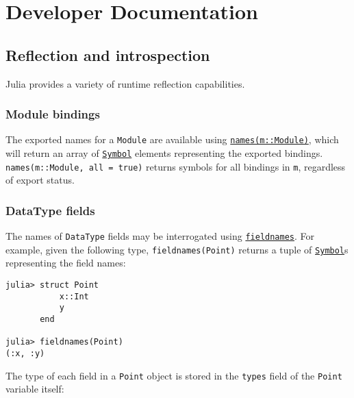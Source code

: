 
\part{Developer Documentation}


\hypertarget{4173225665417100846}{}


\chapter{Reflection and introspection}



Julia provides a variety of runtime reflection capabilities.



\hypertarget{17771187696170422072}{}


\section{Module bindings}



The exported names for a \texttt{Module} are available using \hyperlink{6473328671144201991}{\texttt{names(m::Module)}}, which will return an array of \hyperlink{18332791376992528422}{\texttt{Symbol}} elements representing the exported bindings. \texttt{names(m::Module, all = true)} returns symbols for all bindings in \texttt{m}, regardless of export status.



\hypertarget{14774754942140904122}{}


\section{DataType fields}



The names of \texttt{DataType} fields may be interrogated using \hyperlink{17481253338332315021}{\texttt{fieldnames}}. For example, given the following type, \texttt{fieldnames(Point)} returns a tuple of \hyperlink{18332791376992528422}{\texttt{Symbol}}s representing the field names:




\begin{verbatim}
julia> struct Point
           x::Int
           y
       end

julia> fieldnames(Point)
(:x, :y)
\end{verbatim}



The type of each field in a \texttt{Point} object is stored in the \texttt{types} field of the \texttt{Point} variable itself:





